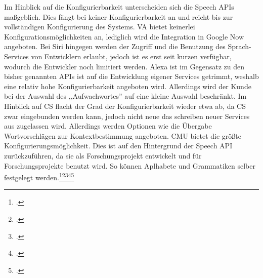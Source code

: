 Im Hinblick auf die Konfigurierbarkeit unterscheiden sich die Speech \ac{API}s maßgeblich. Dies fängt bei keiner Konfigurierbarkeit an und reicht bis zur vollständigen Konfigurierung des Systems. \ac{VA} bietet keinerlei Konfigurationsmöglichkeiten an, lediglich wird die Integration in Google Now angeboten. Bei Siri hingegen werden der Zugriff und die Benutzung des Sprach-Services von Entwicklern erlaubt, jedoch ist es erst seit kurzen verfügbar, wodurch die Entwickler noch limitiert werden. Alexa ist im Gegensatz zu den bisher genannten \ac{API}s ist auf die Entwicklung eigener Services getrimmt, weshalb eine relativ hohe Konfigurierbarkeit angeboten wird. Allerdings wird der Kunde bei der Auswahl des ,,Aufwachwortes'' auf eine kleine Auswahl beschränkt. Im Hinblick auf \ac{CS} flacht der Grad der Konfigurierbarkeit wieder etwa ab, da \ac{CS} zwar eingebunden werden kann, jedoch nicht neue das schreiben neuer Services aus zugelassen wird. Allerdings werden Optionen wie die Übergabe Wortvorschlägen zur Kontextbestimmung angeboten. \ac{CMU} bietet die größte Konfigurierungsmöglichkeit. Dies ist auf den Hintergrund der Speech API zurückzuführen, da sie als Forschungsprojekt entwickelt und für Forschungsprojekte benutzt wird. So können Aplhabete und Grammatiken selber festgelegt werden.\footcite[vgl.:][]{CMUSphinx}\footcite[vgl.:][]{voiceActions}\footcite[vgl.:][]{Siriexplained}\footcite[vgl.:][]{alexaDev}\footcite[vgl.:][]{cloudSpeechAPI}


